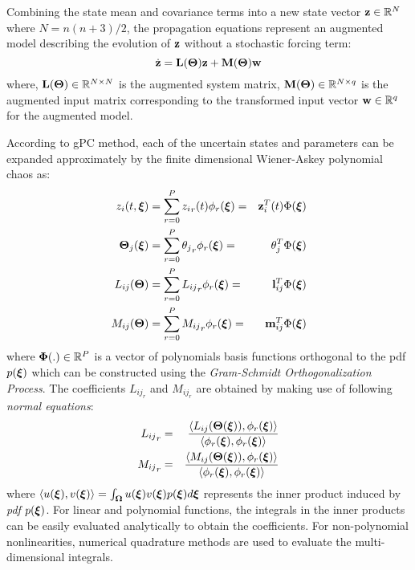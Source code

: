 \documentclass[10pt, conference]{IEEEtran}
\begin{document}
Combining the state mean and covariance terms into a new state vector $\mathbf{z} \in \mathbb R^N$ where $N = n(n+3)/2$, the propagation equations represent an augmented model describing the evolution of $\mathbf{z}$ without a stochastic forcing term:
\begin{equation}
\dot{\mathbf{z}}= \mathbf{L}(\boldsymbol{\Theta})\mathbf{z}+\mathbf{M}(\boldsymbol{\Theta})\mathbf{w} \label{sysdet2}
\end{equation}
where, $\mathbf{L}(\boldsymbol{\Theta}) \in \mathbb R^{N\times N}$ is the augmented system matrix, $\mathbf{M}(\boldsymbol{\Theta}) \in \mathbb R^{N\times q}$ is the augmented input matrix corresponding to the transformed input vector $\mathbf{w} \in \mathbb R^q$ for the augmented model.

According to gPC method, each of the uncertain states and parameters can be expanded approximately by the finite dimensional Wiener-Askey polynomial chaos \cite{xiu:02} as:
\begin{eqnarray}
z_{i}(t,\boldsymbol{\xi}) &= \sum\limits_{r=0}^P {z_i}_r(t)\phi_r(\boldsymbol{\xi}) =& \mathbf{z}_i^T(t)\Phi(\boldsymbol{\xi}) \label{states}\\
\boldsymbol{\Theta}_j(\boldsymbol{\xi}) &= \sum\limits_{r=0}^P {\theta_j}_r\phi_r(\boldsymbol{\xi}) =& \theta_j^T\Phi(\boldsymbol{\xi}) \label{params}\\
L_{ij}(\boldsymbol{\Theta}) &= \sum\limits_{r=0}^P {L_{ij}}_r\phi_r(\boldsymbol{\xi}) =& \mathbf{l}_{ij}^T\Phi(\boldsymbol{\xi}) \label{paramsA}\\
M_{ij}(\boldsymbol{\Theta}) &= \sum\limits_{r=0}^P {M_{ij}}_r\phi_r(\boldsymbol{\xi}) =& \mathbf{m}_{ij}^T\Phi(\boldsymbol{\xi}) \label{paramsB}
\end{eqnarray}
where $\boldsymbol{\Phi}(.)\in \mathbb R ^P$ is a vector of polynomials basis functions orthogonal to the pdf $p(\boldsymbol{\xi})$ which can be constructed using the \textit{Gram-Schmidt Orthogonalization Process}. The coefficients $L_{{ij}_r}$ and $M_{{ij}_r}$ are obtained by making use of following \textit{normal equations}:
\begin{eqnarray}
{L_{ij}}_r &=& \frac{\left\langle L_{ij}(\boldsymbol{\Theta}(\boldsymbol{\xi})),\phi_r(\boldsymbol{\xi})\right\rangle}{\left\langle \phi_r(\boldsymbol{\xi}),\phi_r(\boldsymbol{\xi})\right\rangle} \notag\\
{M_{ij}}_r &=& \frac{\left\langle M_{ij}(\boldsymbol{\Theta}(\boldsymbol{\xi})),\phi_r(\boldsymbol{\xi})\right\rangle}{\left\langle \phi_r(\boldsymbol{\xi}),\phi_r(\boldsymbol{\xi})\right\rangle} \notag
\end{eqnarray}
where $\left\langle u(\boldsymbol{\xi}),v(\boldsymbol{\xi})\right\rangle = \int_{\boldsymbol{\Omega}}{u(\boldsymbol{\xi})v(\boldsymbol{\xi})p(\boldsymbol{\xi})d\boldsymbol{\xi}}$ represents the inner product induced by \textit{pdf} $p(\boldsymbol{\xi})$. For linear and polynomial functions, the integrals in the inner products can be easily evaluated analytically \cite{ghanem:91} to obtain the coefficients. For non-polynomial nonlinearities, numerical quadrature methods are used to evaluate the multi-dimensional integrals. %
\end{document}
